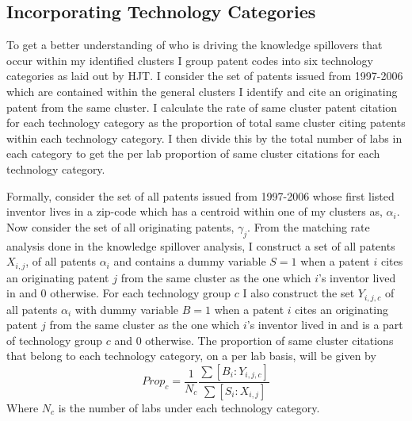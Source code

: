 \documentclass[12pt,letterpaper]{article}
\begin{document}
\subsection{Incorporating Technology Categories}
To get a better understanding of who is driving the knowledge spillovers that occur within my identified clusters I group patent codes into six technology categories as laid out by HJT. I consider the set of patents issued from 1997-2006 which are contained within the general clusters I identify and cite an originating patent from the same cluster. I calculate the rate of same cluster patent citation for each technology category as the proportion of total same cluster citing patents within each technology category. I then divide this by the total number of labs in each category to get the per lab proportion of same cluster citations for each technology category. 
\par 
Formally, consider the set of all patents issued from 1997-2006 whose first listed inventor lives in a zip-code which has a centroid within one of my clusters as, \(\alpha_i\). Now consider the set of all originating patents, \(\gamma_j\). From the matching rate analysis done in the knowledge spillover analysis, I construct a set of all patents \(X_{i,j}\), of all patents \(\alpha_i\) and contains a dummy variable \(S=1\) when a patent \(i\) cites an originating patent \(j\) from the same cluster as the one which \(i\)'s inventor lived in and 0 otherwise. For each technology group \(c\) I also construct the set \(Y_{i,j,c}\) of all patents \(\alpha_i\) with dummy variable \(B=1\) when a patent \(i\) cites an originating patent \(j\) from the same cluster as the one which \(i\)'s inventor lived in and is a part of technology group \(c\) and 0 otherwise. The proportion of same cluster citations that belong to each technology category, on a per lab basis, will be given by 
\begin{equation}
    Prop_c = \frac{1}{N_c}\frac{\sum [B_i:Y_{i,j,c}]}{\sum [S_i:X_{i,j}]}
\end{equation}
Where \(N_c\) is the number of labs under each technology category. 
\end{document}
